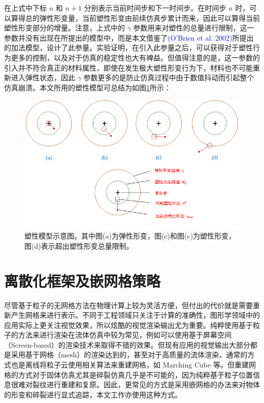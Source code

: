在上式中下标 $n$ 和 $n + 1$ 分别表示当前时间步和下一时间步。在时间步 $n$ 时，可以算得总的弹性形变量，当前塑性形变由前续仿真步累计而来，因此可以算得当前塑性形变部分的增量。注意，上式中的 $\gamma$ 参数用来对塑性的总量进行限制，这一参数并没有出现在所提出的模型中，而是本文借鉴了\textcolor{blue}{(O'Brien et al. 2002)\parencite{OBrien2002}}所提出的加法模型，设计了此参量。实验证明，在引入此参量之后，可以获得对于塑性行为更多的控制，以及对于仿真的稳定性也大有裨益。但值得注意的是，这一参数的引入并不符合真正的材料属性，即使在发生极大塑性形变行为下，材料也不可能重新进入弹性状态，因此 $\gamma$ 参数更多的是防止仿真过程中由于数值抖动而引起整个仿真崩溃。本文所用的塑性模型可总结为如图\ref{plasticity_model}所示：

\begin{figure}[!htb]
  \centering
  \captionsetup{justification=centering}
  \includegraphics[width=\linewidth]{chap/image/plasticity_model}

  \caption{\label{plasticity_model}
           塑性模型示意图。其中图(a)为弹性形变，图(c)和图(c)为塑性形变，图(d)表示超出塑性形变总量限制。
          }
\end{figure}


\section{离散化框架及嵌网格策略}
\label{discretization}

尽管基于粒子的无网格方法在物理计算上较为灵活方便，但付出的代价就是需要重新产生网格来进行表示。不同于工程领域只关注于计算的准确性，图形学领域中的应用实际上更关注视觉效果，所以炫酷的视觉渲染输出尤为重要。纯粹使用基于粒子的方法来进行渲染在流体仿真中较为常见，例如可以使用基于屏幕空间（Screen-based）的渲染技术来取得不错的效果。但现有应用的视觉输出大部分都是采用基于网格（mesh）的渲染达到的，甚至对于高质量的流体渲染，通常的方式也是离线将粒子云使用相关算法来重建网格，如 Marching Cube 等。但重建网格的方式对于固体仿真尤其是碎裂仿真几乎是不可能的，因为纯粹基于粒子位置信息很难对裂纹进行重建和复原。因此，更常见的方式是采用嵌网格的办法来对物体的形变和碎裂进行显式追踪，本文工作亦使用这种方式。

